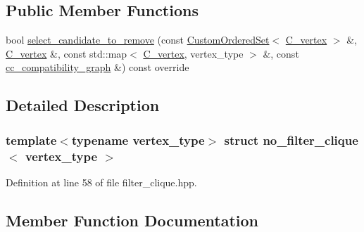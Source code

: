 \subsection*{Public Member Functions}
\begin{DoxyCompactItemize}
\item 
bool \hyperlink{structno__filter__clique_a61a430e7a7c41359fcb7a4624cba423e}{select\+\_\+candidate\+\_\+to\+\_\+remove} (const \hyperlink{classCustomOrderedSet}{Custom\+Ordered\+Set}$<$ \hyperlink{clique__covering__graph_8hpp_a9cb45047ea8c5ed95a8cfa90494345aa}{C\+\_\+vertex} $>$ \&, \hyperlink{clique__covering__graph_8hpp_a9cb45047ea8c5ed95a8cfa90494345aa}{C\+\_\+vertex} \&, const std\+::map$<$ \hyperlink{clique__covering__graph_8hpp_a9cb45047ea8c5ed95a8cfa90494345aa}{C\+\_\+vertex}, vertex\+\_\+type $>$ \&, const \hyperlink{clique__covering__graph_8hpp_aa88e9419fe776ef37020cacd507cc4ad}{cc\+\_\+compatibility\+\_\+graph} \&) const override
\end{DoxyCompactItemize}


\subsection{Detailed Description}
\subsubsection*{template$<$typename vertex\+\_\+type$>$\newline
struct no\+\_\+filter\+\_\+clique$<$ vertex\+\_\+type $>$}



Definition at line 58 of file filter\+\_\+clique.\+hpp.



\subsection{Member Function Documentation}
\mbox{\label{structno__filter__clique_a61a430e7a7c41359fcb7a4624cba423e}} 
